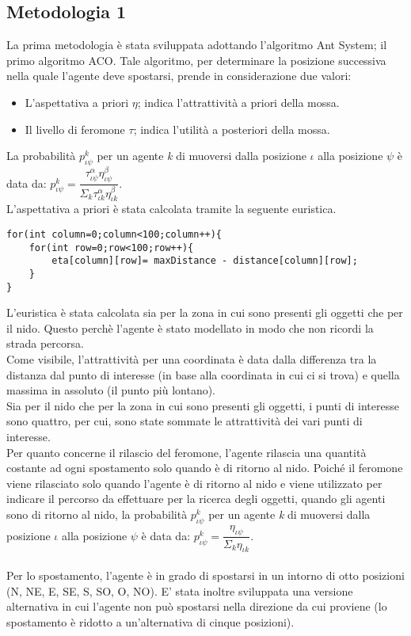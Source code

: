 \documentclass[12pt,a4paper,openright,twoside]{report}
\begin{document}
\subsection{Metodologia 1}

La prima metodologia è stata sviluppata adottando l'algoritmo Ant System; il primo algoritmo ACO.
Tale algoritmo, per determinare la posizione successiva nella quale l'agente deve spostarsi, prende in considerazione due valori:

\begin{itemize}
	\item L'aspettativa a priori $\eta$; indica l'attrattività a priori della mossa.
	\item Il livello di feromone $\tau$; indica l'utilità a posteriori della mossa.
\end{itemize}

La probabilità $p^k_{\iota\psi}$ per un agente \textit{k} di muoversi dalla posizione $\iota$ alla posizione $\psi$ è data da: $p^k_{\iota\psi}= \dfrac{\tau^\alpha_{\iota\psi}\eta^\beta_{\iota\psi}}{\Sigma_k\tau^\alpha_{\iota k}\eta^\beta_{\iota k}}$. \\

L'aspettativa a priori è stata calcolata tramite la seguente euristica. \\

\begin{verbatim}
for(int column=0;column<100;column++){
    for(int row=0;row<100;row++){
        eta[column][row]= maxDistance - distance[column][row];
    }
}
\end{verbatim}

L'euristica è stata calcolata sia per la zona in cui sono presenti gli oggetti che per il nido. Questo perchè l'agente è stato modellato in modo che non ricordi la strada percorsa.\\
Come visibile, l'attrattività per una coordinata è data dalla differenza tra la distanza dal punto di interesse (in base alla coordinata in cui ci si trova) e quella massima in assoluto (il punto più lontano).\\
Sia per il nido che per la zona in cui sono presenti gli oggetti, i punti di interesse sono quattro, per cui, sono state sommate le attrattività dei vari punti di interesse.\\
Per quanto concerne il rilascio del feromone, l'agente rilascia una quantità costante ad ogni spostamento solo quando è di ritorno al nido. Poiché il feromone viene rilasciato solo quando l'agente è di ritorno al nido e viene utilizzato per indicare il percorso da effettuare per la ricerca degli oggetti, quando gli agenti sono di ritorno al nido, la probabilità  $p^k_{\iota\psi}$ per un agente \textit{k} di muoversi dalla posizione $\iota$ alla posizione $\psi$ è data da: $p^k_{\iota\psi}= \dfrac{\eta_{\iota\psi}}{\Sigma_k\eta_{\iota k}}$. \\\\
Per lo spostamento, l'agente è in grado di spostarsi in un intorno di otto posizioni (N, NE, E, SE, S, SO, O, NO). E' stata inoltre sviluppata una versione alternativa in cui l'agente non può spostarsi nella direzione da cui proviene (lo spostamento è ridotto a un'alternativa di cinque posizioni).
\end{document}
